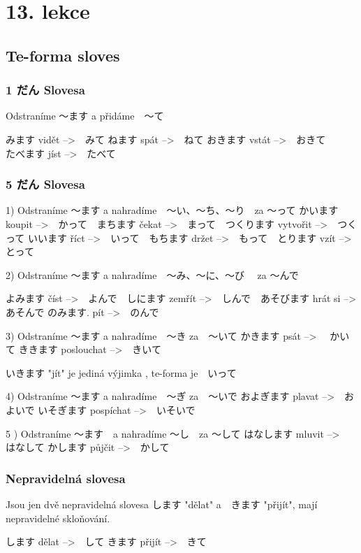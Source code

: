 \section{13. lekce}
\label{sec:lekce_13}

\subsection{Te-forma sloves}
\subsubsection{1 だん Slovesa}

Odstraníme 〜ます a přidáme　〜て　

みます vidět -->　みて			ねます spát -->　ねて
おきます vstát -->　おきて　　　　たべます jíst -->　たべて

\subsubsection{5 だん Slovesa}

1) Odstraníme 〜ます a nahradíme　〜い、〜ち、〜り　za 〜って
かいます koupit -->　かって　まちます čekat -->　まって　つくります vytvořit -->　つくって
いいます říct -->　いって　もちます držet -->　もって　とります vzít -->　とって

2) Odstraníme 〜ます a nahradíme　〜み、〜に、〜び　 za 〜んで

よみます číst -->　よんで　しにます zemřít -->　しんで　あそびます hrát si -->　あそんで
のみます. pít -->　のんで

3) Odstraníme 〜ます a nahradíme　〜き za　〜いて
かきます psát -->　 かいて
ききます poslouchat -->　きいて

いきます "jít" je jediná výjimka , te-forma je　いって

4) Odstraníme 〜ます a nahradíme　〜ぎ za　〜いで
およぎます plavat -->　およいで
いそぎます pospíchat -->　いそいで

5 ) Odstraníme 〜ます　a nahradíme 〜し　za 〜して
はなします mluvit -->　はなして
かします půjčit -->　かして

\subsubsection{Nepravidelná slovesa}
Jsou jen dvě nepravidelná slovesa します "dělat" a　きます "přijít", mají nepravidelné skloňování.

します dělat -->　して
きます přijít -->　きて



